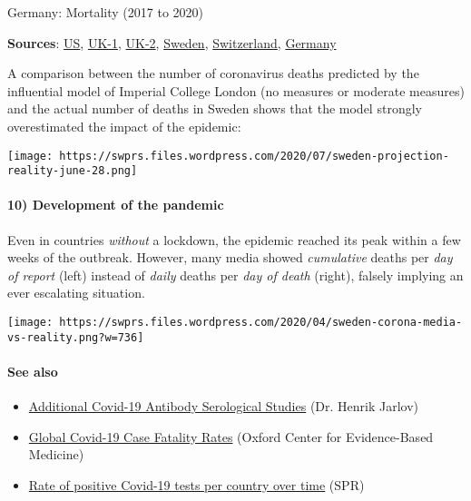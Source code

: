 Germany: Mortality (2017 to 2020)

\textbf{Sources}:
\href{https://twitter.com/boriquagato/status/1267174557976166402}{US},
\href{https://off-guardian.org/2020/05/25/were-all-in-the-big-numbers-now/}{UK-1},
\href{http://inproportion2.talkigy.com/}{UK-2},
\href{https://twitter.com/HaraldofW/status/1277357228635414529}{Sweden},
\href{https://swprs.org/covid-19-hinweis-ii/}{Switzerland},
\href{https://www.destatis.de/DE/Themen/Gesellschaft-Umwelt/Bevoelkerung/Sterbefaelle-Lebenserwartung/sterbefallzahlen.html}{Germany}

A comparison between the number of coronavirus deaths predicted by the
influential model of Imperial College London (no measures or moderate
measures) and the actual number of deaths in Sweden shows that the model
strongly overestimated the impact of the epidemic:

\texttt{[image: https://swprs.files.wordpress.com/2020/07/sweden-projection-reality-june-28.png]}

\hypertarget{10-development-of-the-pandemic}{%
\paragraph{10) Development of the
pandemic}\label{10-development-of-the-pandemic}}

Even in countries \emph{without} a lockdown, the epidemic reached its
peak within a few weeks of the outbreak. However, many media showed
\emph{cumulative} deaths per \emph{day of report} (left) instead of
\emph{daily} deaths per \emph{day of death} (right), falsely implying an
ever escalating situation.

\texttt{[image: https://swprs.files.wordpress.com/2020/04/sweden-corona-media-vs-reality.png?w=736]}

\hypertarget{see-also}{%
\paragraph{See also}\label{see-also}}

\begin{itemize}
\tightlist
\item
  \href{https://docs.google.com/spreadsheets/d/17Tf1Ln9VuE5ovpnhLRBJH-33L5KRaiB3NhvaiF3hWC0/}{Additional
  Covid-19 Antibody Serological Studies} (Dr. Henrik Jarlov)
\item
  \href{https://www.cebm.net/covid-19/global-covid-19-case-fatality-rates/}{Global
  Covid-19 Case Fatality Rates} (Oxford Center for Evidence-Based
  Medicine)
\item
  \href{https://swprs.org/rate-of-positive-covid19-tests/}{Rate of
  positive Covid-19 tests per country over time} (SPR)
\end{itemize}

